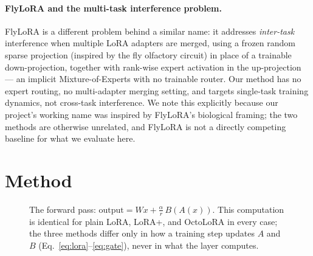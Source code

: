 \documentclass[11pt]{article}
\begin{document}
\paragraph{FlyLoRA and the multi-task interference problem.} FlyLoRA
\citep{flylora2025} is a different problem behind a similar name: it
addresses \emph{inter-task} interference when multiple LoRA adapters are
merged, using a frozen random sparse projection (inspired by the fly
olfactory circuit) in place of a trainable down-projection, together with
rank-wise expert activation in the up-projection — an implicit
Mixture-of-Experts with no trainable router. Our method has no expert
routing, no multi-adapter merging setting, and targets single-task
training dynamics, not cross-task interference. We note this explicitly
because our project's working name was inspired by FlyLoRA's biological
framing; the two methods are otherwise unrelated, and FlyLoRA is not a
directly competing baseline for what we evaluate here.

\section{Method}
\label{sec:method}

\begin{figure}[t]
\centering
{}
\caption{The forward pass: $\text{output} = Wx + \tfrac{\alpha}{r}\,B(A(x))$.
This computation is identical for plain LoRA, LoRA+, and OctoLoRA in every
case; the three methods differ only in how a training step updates $A$ and
$B$ (Eq.~\ref{eq:lora}--\ref{eq:gate}), never in what the layer computes.}
\label{fig:lora}
\end{figure}
\end{document}
